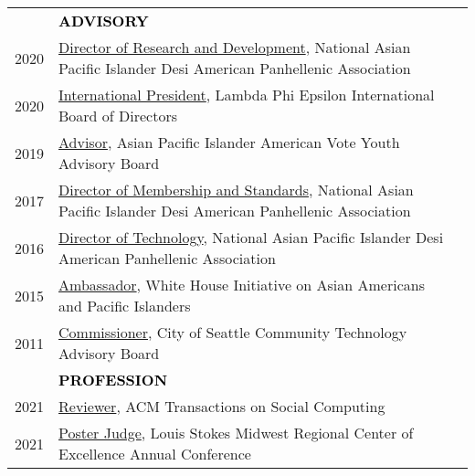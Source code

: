 \documentclass[11pt]{article}
\begin{document}
{{\begin{longtable}{Rp{0.75in}p{5.0in}}
& \textcolor{black}{\uppercase{\textbf{Advisory}}}\\
\footnotesize{2020} & \href{http://www.napahq.org/}{{Director of Research and Development}}, National Asian Pacific Islander Desi American Panhellenic Association\\

\footnotesize{2020} & \href{http://lambdaphiepsilon.com}{{International President}}, Lambda Phi Epsilon International Board of Directors\\

\footnotesize{2019} & \href{https://www.apiavote.org/youth-ambassadors}{{Advisor}}, Asian Pacific Islander American Vote Youth Advisory Board\\

\footnotesize{2017} & \href{http://www.napahq.org/}{{Director of Membership and Standards}}, National Asian Pacific Islander Desi American Panhellenic Association\\

\footnotesize{2016} & \href{http://www.napahq.org/}{{Director of Technology}}, National Asian Pacific Islander Desi American Panhellenic Association\\

\footnotesize{2015} & \href{https://obamawhitehouse.archives.gov/blog/2015/09/04/white-house-initiative-aapis-selects-23-young-leaders-serve-2015-2016-e3-ambassadors}{{Ambassador}}, White House Initiative on Asian Americans and Pacific Islanders\\

\footnotesize{2011} & \href{https://web.archive.org/web/20150911093548/https://ischool.uw.edu/alumni/impact-stories/informatics-grad-and-husky-promise-student-aims-deliver-it-resources}{{Commissioner}}, City of Seattle Community Technology Advisory Board\\

& \textcolor{black}{\uppercase{\textbf{Profession}}}\\
\footnotesize{2021} & 
\href{https://dl.acm.org/journal/tsc}{{Reviewer}}, ACM Transactions on Social Computing\\

\footnotesize{2021} & \href{https://lsmrce.org/events/annual/2021-annual/2021-conference-overview.aspx}{{Poster Judge}}, Louis Stokes Midwest Regional Center of Excellence Annual Conference\\


\end{longtable}}}
\end{document}
